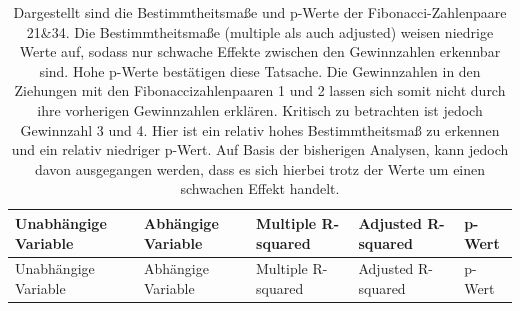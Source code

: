 \documentclass[ngerman,]{article}
\begin{document}
\begin{longtable}[]{@{}lllll@{}}
\caption{Dargestellt sind die Bestimmtheitsmaße und p-Werte der
Fibonacci-Zahlenpaare 21\&34. Die Bestimmtheitsmaße (multiple als auch
adjusted) weisen niedrige Werte auf, sodass nur schwache Effekte
zwischen den Gewinnzahlen erkennbar sind. Hohe p-Werte bestätigen diese
Tatsache. Die Gewinnzahlen in den Ziehungen mit den
Fibonaccizahlenpaaren 1 und 2 lassen sich somit nicht durch ihre
vorherigen Gewinnzahlen erklären. Kritisch zu betrachten ist jedoch
Gewinnzahl 3 und 4. Hier ist ein relativ hohes Bestimmtheitsmaß zu
erkennen und ein relativ niedriger p-Wert. Auf Basis der bisherigen
Analysen, kann jedoch davon ausgegangen werden, dass es sich hierbei
trotz der Werte um einen schwachen Effekt handelt.}\tabularnewline
\toprule
\begin{minipage}[b]{0.23\columnwidth}\raggedright\strut
Unabhängige Variable\strut
\end{minipage} & \begin{minipage}[b]{0.19\columnwidth}\raggedright\strut
Abhängige Variable\strut
\end{minipage} & \begin{minipage}[b]{0.19\columnwidth}\raggedright\strut
Multiple R-squared\strut
\end{minipage} & \begin{minipage}[b]{0.19\columnwidth}\raggedright\strut
Adjusted R-squared\strut
\end{minipage} & \begin{minipage}[b]{0.07\columnwidth}\raggedright\strut
p-Wert\strut
\end{minipage}\tabularnewline
\midrule
\endfirsthead
\toprule
\begin{minipage}[b]{0.23\columnwidth}\raggedright\strut
Unabhängige Variable\strut
\end{minipage} & \begin{minipage}[b]{0.19\columnwidth}\raggedright\strut
Abhängige Variable\strut
\end{minipage} & \begin{minipage}[b]{0.19\columnwidth}\raggedright\strut
Multiple R-squared\strut
\end{minipage} & \begin{minipage}[b]{0.19\columnwidth}\raggedright\strut
Adjusted R-squared\strut
\end{minipage} & \begin{minipage}[b]{0.07\columnwidth}\raggedright\strut
p-Wert\strut
\end{minipage}\tabularnewline

\end{longtable}
\end{document}
